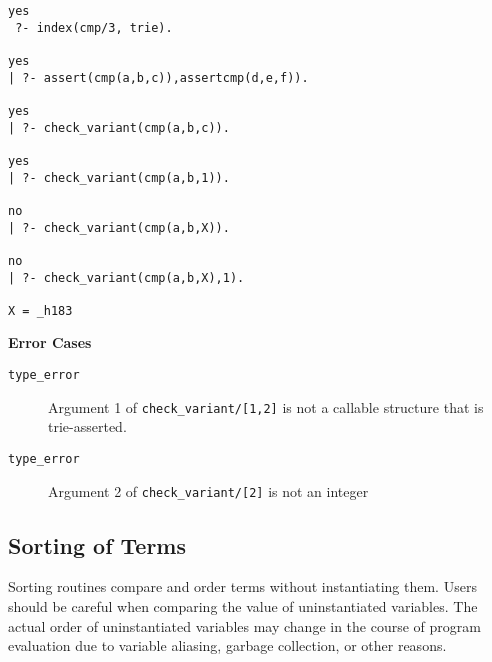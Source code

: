 \begin{description}
\begin{example}
\begin{small}
\begin{verbatim}
yes
 ?- index(cmp/3, trie).

yes
| ?- assert(cmp(a,b,c)),assertcmp(d,e,f)).

yes
| ?- check_variant(cmp(a,b,c)).

yes
| ?- check_variant(cmp(a,b,1)).

no
| ?- check_variant(cmp(a,b,X)).

no
| ?- check_variant(cmp(a,b,X),1).

X = _h183
\end{verbatim}
\end{small}
\end{example}

{\bf Error Cases}
     \begin{description}
     \item[{\tt type\_error}] Argument 1 of {\tt check\_variant/[1,2]}
       is not a callable structure that is trie-asserted.
     \item[{\tt type\_error}]
	Argument 2 of {\tt check\_variant/[2]} is not an integer
     \end{description}

\end{description}

\subsection{Sorting of Terms}

Sorting routines compare and order terms without instantiating them.
Users should be careful when comparing the value of uninstantiated
variables.  The actual order of uninstantiated variables may change in
the course of program evaluation due to variable aliasing, garbage
collection, or other reasons.

